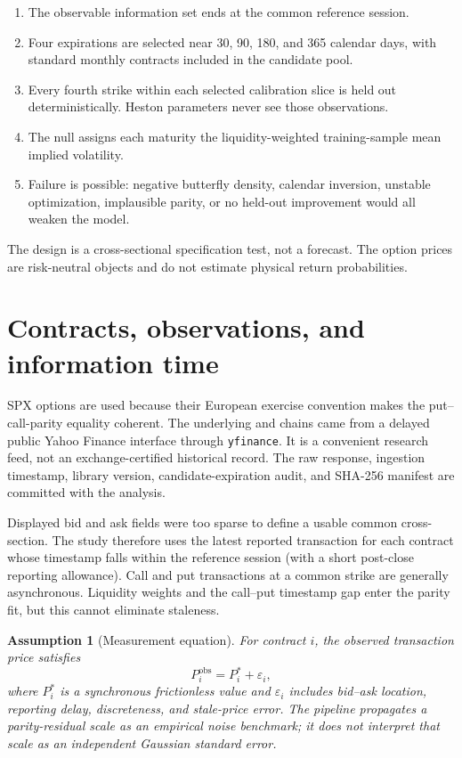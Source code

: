 \documentclass[11pt,oneside]{article}
\newtheorem{assumption}{Assumption}
\begin{document}
\begin{enumerate}
  \item The observable information set ends at the common reference session.
  \item Four expirations are selected near 30, 90, 180, and 365 calendar days, with
        standard monthly contracts included in the candidate pool.
  \item Every fourth strike within each selected calibration slice is held out
        deterministically. Heston parameters never see those observations.
  \item The null assigns each maturity the liquidity-weighted training-sample mean
        implied volatility.
  \item Failure is possible: negative butterfly density, calendar inversion,
        unstable optimization, implausible parity, or no held-out improvement would
        all weaken the model.
\end{enumerate}

The design is a cross-sectional specification test, not a forecast. The option
prices are risk-neutral objects and do not estimate physical return probabilities.

\section{Contracts, observations, and information time}

SPX options are used because their European exercise convention makes the
put--call-parity equality coherent. The underlying and chains came from a delayed
public Yahoo Finance interface through \texttt{yfinance}. It is a convenient
research feed, not an exchange-certified historical record. The raw response,
ingestion timestamp, library version, candidate-expiration audit, and SHA-256
manifest are committed with the analysis.

Displayed bid and ask fields were too sparse to define a usable common cross-section.
The study therefore uses the latest reported transaction for each contract whose
timestamp falls within the reference session (with a short post-close reporting
allowance). Call and put transactions at a common strike are generally asynchronous.
Liquidity weights and the call--put timestamp gap enter the parity fit, but this
cannot eliminate staleness.

\begin{assumption}[Measurement equation]
For contract $i$, the observed transaction price satisfies
\[
  P_i^{\mathrm{obs}}=P_i^{\ast}+\varepsilon_i,
\]
where $P_i^\ast$ is a synchronous frictionless value and $\varepsilon_i$ includes
bid--ask location, reporting delay, discreteness, and stale-price error. The
pipeline propagates a parity-residual scale as an empirical noise benchmark; it
does not interpret that scale as an independent Gaussian standard error.
\end{assumption}
\end{document}
